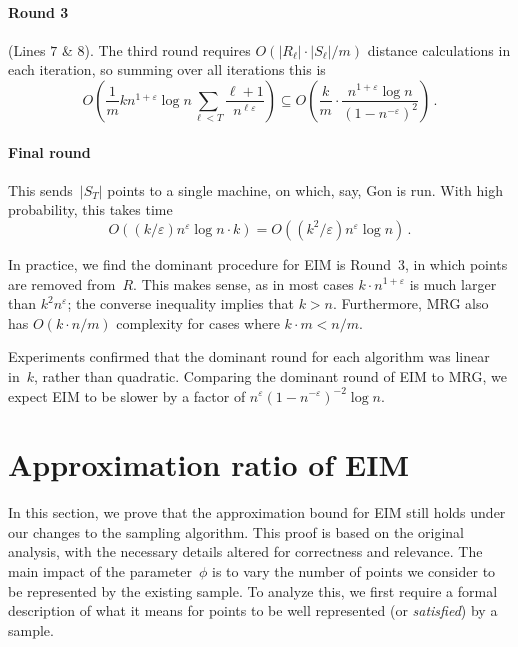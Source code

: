 \documentclass[11pt]{article}
\newcommand{\eps}{\ensuremath{\varepsilon}}
\newcommand{\ours}{{\sc MRG}\xspace}
\newcommand{\ene}{{\sc EIM}\xspace}
\newcommand{\gon}{{\sc Gon}\xspace}
\begin{document}
\paragraph*{Round 3}
(Lines $7$ \& $8$). 
The third round requires $O(|R_{\ell}|\cdot|S_{\ell}|/m)$ distance calculations in each
iteration, so summing over all iterations this is
\vspace{-2mm}
$$
  O \left( \frac 1 m k n^{1+\eps}\log n\sum_{\ell < T} \frac{\ell+1}{n^{\ell\eps}}\right)
 \subseteq O\left(\frac{k}{m} \cdot \frac{n^{1+\eps}\log n}{(1-{n^{-\eps}})^2} \right)\,.
$$\vspace{-6mm}


\paragraph*{Final round}
 This sends~$|S_T|$ points to a single machine,
on which, say,  \gon is run.
With high probability,
this takes time $$O(({k}/{\eps})n^{\eps}\log n \cdot k)=
O(({k^2}/{\eps})n^{\eps}\log n)\,.$$


In practice, we find the dominant procedure for \ene is Round~3, in which points are
removed from~$R$.
This makes sense, as in most cases $k\cdot n^{1+\eps}$ is much larger than
$k^2 n^{\eps}$; the converse inequality implies that $k > n$.
Furthermore, \ours also has $O(k\cdot n/ m)$ complexity for cases where $k\cdot m<n/m$.


Experiments confirmed that
the dominant round for each algorithm was linear in~$k$, rather
than quadratic.
Comparing the dominant round of \ene to \ours,
we expect  \ene to be slower by a factor of
$n^{\eps}(1-{n^{-\eps}})^{-2} \log n$. 





\section{Approximation ratio of \ene}
\label{sec:sampling}




In this section, we prove that the approximation bound for
\ene still holds under our changes to the sampling algorithm. 
This proof is based on the original analysis,
with the necessary details altered for correctness and relevance.
The main impact of the parameter~$\phi$ is to vary the number of points we consider to be represented by the existing sample. 
To analyze this,
we first require a formal description of what it means for points to be well represented (or \emph{satisfied}) by a sample.
\end{document}
